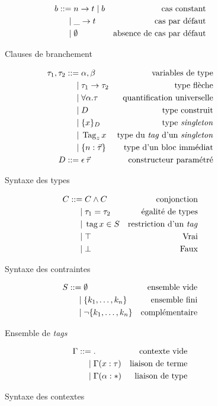 \begin{figure}
\begin{align*}
  b ::=& \; n \rightarrow t \; | \; b
    & \text{cas constant}
  \\ |& \;  \_ \rightarrow t
    & \text{cas par défaut}
  \\ |& \;  \emptyset
    & \text{absence de cas par défaut}
\end{align*}
\caption{Clauses de branchement}
\end{figure}

\begin{figure}
\begin{align*}
  \tau_1, \tau_2 ::=& \; \alpha, \beta
    & \text{variables de type}
  \\ |& \;  \tau_1 \rightarrow \tau_2
    & \text{type flèche}
  \\ |& \;  \forall \alpha. \tau
    & \text{quantification universelle}
  \\ |& \;  D
    & \text{type construit}
  \\ |& \;  \{ x \}_D
    & \text{type \emph{singleton}}
  \\ |& \;  \operatorname{Tag}_z x
    & \text{type du \emph{tag} d'un \emph{singleton}}
  \\ |& \;  \{ n: \vec{\tau} \}
    & \text{type d'un bloc immédiat}
  \\
  D ::=& \; \epsilon \, \vec{\tau}
    & \text{constructeur paramétré}
\end{align*}
\caption{Syntaxe des types}
\end{figure}

\begin{figure}
\begin{align*}
  C ::=& \; C \wedge C
    & \text{conjonction}
  \\ |& \;  \tau_1 = \tau_2
    & \text{égalité de types}
  \\ |& \;  \operatorname{tag} x \in S
    & \text{restriction d'un \emph{tag}}
  \\ |& \;  \top
    & \text{Vrai}
  \\ |& \;  \bot
    & \text{Faux}
\end{align*}
\caption{Syntaxe des contraintes}
\end{figure}

\begin{figure}
\begin{align*}
  S ::=& \; \emptyset
    & \text{ensemble vide}
  \\ |& \;  \{ k_1, \ldots, k_n \}
    & \text{ensemble fini}
  \\ |& \;  \lnot \{ k_1, \ldots, k_n \}
    & \text{complémentaire}
\end{align*}
\caption{Ensemble de \emph{tags}}
\end{figure}

\begin{figure}
\begin{align*}
  \Gamma ::=& \; .
    & \text{contexte vide}
  \\ |& \; \Gamma (x : \tau)
    & \text{liaison de terme}
  \\ |& \; \Gamma (\alpha : *)
    & \text{liaison de type}
\end{align*}
\caption{Syntaxe des contextes}
\end{figure}

